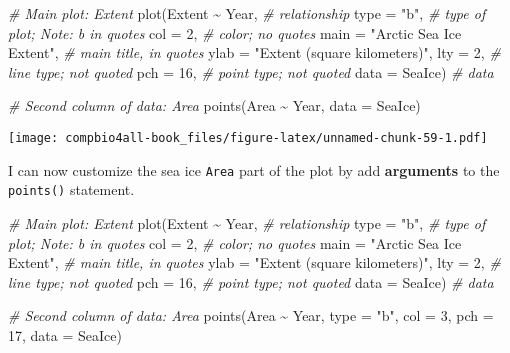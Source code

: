 \documentclass[
]{book}
\newenvironment{Shaded}{\begin{snugshade}}{\end{snugshade}}
\newcommand{\AttributeTok}[1]{\textcolor[rgb]{0.77,0.63,0.00}{#1}}
\newcommand{\CommentTok}[1]{\textcolor[rgb]{0.56,0.35,0.01}{\textit{#1}}}
\newcommand{\DecValTok}[1]{\textcolor[rgb]{0.00,0.00,0.81}{#1}}
\newcommand{\FunctionTok}[1]{\textcolor[rgb]{0.00,0.00,0.00}{#1}}
\newcommand{\NormalTok}[1]{#1}
\newcommand{\SpecialCharTok}[1]{\textcolor[rgb]{0.00,0.00,0.00}{#1}}
\newcommand{\StringTok}[1]{\textcolor[rgb]{0.31,0.60,0.02}{#1}}
\begin{document}
\begin{Shaded}
\begin{Highlighting}[]
\CommentTok{\# Main plot: Extent}
\FunctionTok{plot}\NormalTok{(Extent }\SpecialCharTok{\textasciitilde{}}\NormalTok{ Year,  }\CommentTok{\# relationship}
     \AttributeTok{type =} \StringTok{"b"}\NormalTok{,     }\CommentTok{\# type of plot; Note: b in quotes}
     \AttributeTok{col =} \DecValTok{2}\NormalTok{,        }\CommentTok{\# color; no quotes}
     \AttributeTok{main =} \StringTok{"Arctic Sea Ice Extent"}\NormalTok{, }\CommentTok{\# main title, in quotes}
     \AttributeTok{ylab =} \StringTok{"Extent (square kilometers)"}\NormalTok{,}
     \AttributeTok{lty =} \DecValTok{2}\NormalTok{,        }\CommentTok{\# line type; not quoted}
     \AttributeTok{pch =} \DecValTok{16}\NormalTok{,       }\CommentTok{\# point type; not quoted}
     \AttributeTok{data =}\NormalTok{ SeaIce)  }\CommentTok{\# data}

\CommentTok{\# Second column of data: Area}
\FunctionTok{points}\NormalTok{(Area }\SpecialCharTok{\textasciitilde{}}\NormalTok{ Year, }\AttributeTok{data =}\NormalTok{ SeaIce)}
\end{Highlighting}
\end{Shaded}

\texttt{[image: compbio4all-book\_files/figure-latex/unnamed-chunk-59-1.pdf]}

I can now customize the sea ice \texttt{Area} part of the plot by add \textbf{arguments} to the \texttt{points()} statement.

\begin{Shaded}
\begin{Highlighting}[]
\CommentTok{\# Main plot: Extent}
\FunctionTok{plot}\NormalTok{(Extent }\SpecialCharTok{\textasciitilde{}}\NormalTok{ Year,  }\CommentTok{\# relationship}
     \AttributeTok{type =} \StringTok{"b"}\NormalTok{,     }\CommentTok{\# type of plot; Note: b in quotes}
     \AttributeTok{col =} \DecValTok{2}\NormalTok{,        }\CommentTok{\# color; no quotes}
     \AttributeTok{main =} \StringTok{"Arctic Sea Ice Extent"}\NormalTok{, }\CommentTok{\# main title, in quotes}
     \AttributeTok{ylab =} \StringTok{"Extent (square kilometers)"}\NormalTok{,}
     \AttributeTok{lty =} \DecValTok{2}\NormalTok{,        }\CommentTok{\# line type; not quoted}
     \AttributeTok{pch =} \DecValTok{16}\NormalTok{,       }\CommentTok{\# point type; not quoted}
     \AttributeTok{data =}\NormalTok{ SeaIce)  }\CommentTok{\# data}

\CommentTok{\# Second column of data: Area}
\FunctionTok{points}\NormalTok{(Area }\SpecialCharTok{\textasciitilde{}}\NormalTok{ Year,}
       \AttributeTok{type =} \StringTok{"b"}\NormalTok{,}
       \AttributeTok{col =} \DecValTok{3}\NormalTok{,}
       \AttributeTok{pch =} \DecValTok{17}\NormalTok{,}
       \AttributeTok{data =}\NormalTok{ SeaIce)}
\end{Highlighting}
\end{Shaded}
\end{document}

